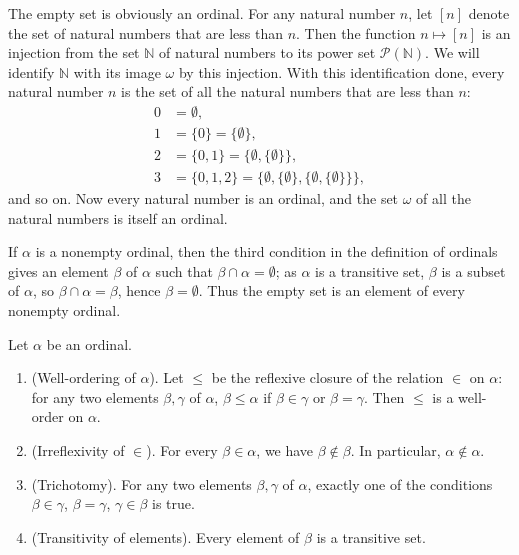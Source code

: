 \documentclass{article}
\begin{document}
The empty set is obviously an ordinal.  For any natural number \(n\),
let \([n]\) denote the set of natural numbers that are less than
\(n\).  Then the function \(n \mapsto [n]\) is an injection from the
set \(\mathbb{N}\) of natural numbers to its power set
\(\mathcal{P}(\mathbb{N})\).  We will identify \(\mathbb{N}\) with its
image \(\omega\) by this injection.  With this identification done,
every natural number \(n\) is the set of all the natural numbers that
are less than \(n\):
\begin{align*}
  0 & = \emptyset, \\
  1 &= \{ 0 \} = \{ \emptyset \}, \\
  2 &= \{ 0, 1 \} = \{ \emptyset, \{ \emptyset \} \}, \\
  3 &= \{ 0, 1, 2 \} =
      \{
      \emptyset, \{ \emptyset \}, \{ \emptyset, \{ \emptyset \} \}
      \},
\end{align*}
and so on.  Now every natural number is an ordinal, and the set
\(\omega\) of all the natural numbers is itself an ordinal.

If \(\alpha\) is a nonempty ordinal, then the third condition in the
definition of ordinals gives an element \(\beta\) of \(\alpha\) such
that \(\beta \cap \alpha = \emptyset\); as \(\alpha\) is a transitive
set, \(\beta\) is a subset of \(\alpha\), so
\(\beta \cap \alpha = \beta\), hence \(\beta = \emptyset\).  Thus the
empty set is an element of every nonempty ordinal.

\begin{theorem}
  \label{thm:7cc2cckf}
  Let \(\alpha\) be an ordinal.
  \begin{enumerate}
  \item (Well-ordering of \(\alpha\)).  Let \(\leq\) be the reflexive
    closure of the relation \(\in\) on \(\alpha\): for any two
    elements \(\beta, \gamma\) of \(\alpha\), \(\beta \leq \alpha\) if
    \(\beta \in \gamma\) or \(\beta = \gamma\).  Then \(\leq\) is a
    well-order on \(\alpha\).
  \item (Irreflexivity of \(\in\)).  For every \(\beta \in \alpha\),
    we have \(\beta \notin \beta\).  In particular,
    \(\alpha \notin \alpha\).
  \item (Trichotomy).  For any two elements \(\beta, \gamma\) of
    \(\alpha\), exactly one of the conditions \(\beta \in \gamma\),
    \(\beta = \gamma\), \(\gamma \in \beta\) is true.
  \item (Transitivity of elements).  Every element of \(\beta\) is a
    transitive set.
  \end{enumerate}
\end{theorem}
\end{document}
